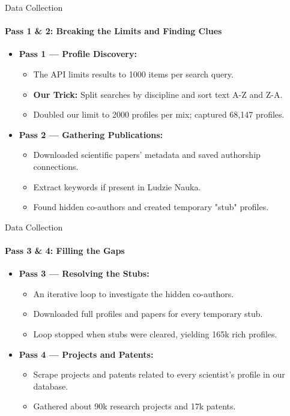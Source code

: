 \documentclass{beamer}
\begin{document}
\begin{frame}{Data Collection}
    \framesubtitle{Pass 1 \& 2: Breaking the Limits and Finding Clues}
    \begin{itemize}
        \item \textbf{Pass 1 --- Profile Discovery:}
        \begin{itemize}
            \item The API limits results to 1000 items per search query.
            \item \textbf{Our Trick:} Split searches by discipline and sort text A-Z and Z-A.
            \item Doubled our limit to 2000 profiles per mix; captured 68,147 profiles.
        \end{itemize}
        \item \textbf{Pass 2 --- Gathering Publications:}
        \begin{itemize}
            \item Downloaded scientific papers' metadata and saved authorship connections.
            \item Extract keywords if present in Ludzie Nauka.
            \item Found hidden co-authors and created temporary "stub" profiles.
        \end{itemize}
    \end{itemize}
\end{frame}

\begin{frame}{Data Collection}
    \framesubtitle{Pass 3 \& 4: Filling the Gaps}
    \begin{itemize}
        \item \textbf{Pass 3 --- Resolving the Stubs:}
        \begin{itemize}
            \item An iterative loop to investigate the hidden co-authors.
            \item Downloaded full profiles and papers for every temporary stub.
            \item Loop stopped when stubs were cleared, yielding 165k rich profiles.
        \end{itemize}
        \item \textbf{Pass 4 --- Projects and Patents:}
        \begin{itemize}
            \item Scrape projects and patents related to every scientist's profile in our database.
            \item Gathered about 90k research projects and 17k patents.
        \end{itemize}
    \end{itemize}
\end{frame}
\end{document}
